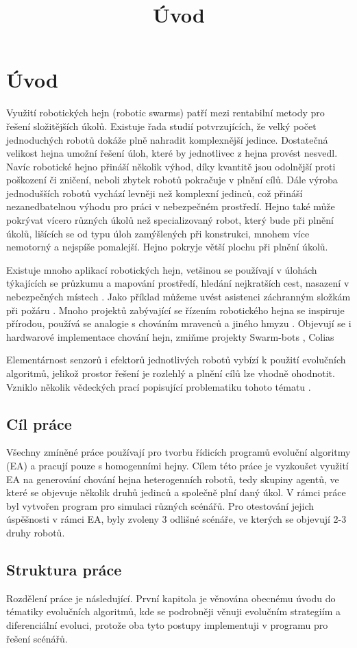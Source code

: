 \chapter*{Úvod}

\title{Úvod}
Využití robotických hejn (robotic swarms) patří mezi rentabilní metody pro řešení složitějších úkolů. Existuje řada studií potvrzujících, že velký počet jednoduchých robotů dokáže plně nahradit komplexnější jedince. Dostatečná velikost hejna umožní řešení úloh, které by jednotlivec z hejna provést nesvedl. Navíc robotické hejno přináší několik výhod, díky kvantitě jsou odolnější proti poškození či zničení, neboli zbytek robotů pokračuje v plnění cílů. Dále výroba jednodušších robotů vychází levněji než komplexní jedinců, což přináší nezanedbatelnou výhodu pro práci v nebezpečném prostředí. Hejno také může pokrývat vícero různých úkolů než specializovaný robot, který bude při plnění úkolů, lišících se od typu úloh zamýšlených při konstrukci, mnohem více nemotorný a nejspíše pomalejší. Hejno pokryje větší plochu při plnění úkolů. 
\par
Existuje mnoho aplikací robotických hejn, vetšinou se používají v úlohách týkajících se průzkumu a mapování prostředí, hledání nejkratších cest, nasazení v nebezpečných místech \citep{swarmApp}. Jako příklad můžeme uvést asistenci záchranným složkám při požáru \citep{fireRobots}. Mnoho projektů zabývající se řízením robotického hejna se inspiruje přírodou, používá se analogie s chováním mravenců a jiného hmyzu \citep{PheroRobot}. Objevují se i hardwarové implementace chování hejn, zmiňme projekty Swarm-bots \citep{swarmBots}, Colias \citep{Colias}  
\par 
Elementárnost senzorů i efektorů jednotlivých robotů vybízí k použití evolučních algoritmů, jelikož prostor řešení je rozlehlý a plnění cílů lze vhodně ohodnotit. Vzniklo několik vědeckých prací popisující problematiku tohoto tématu \citep{ENovel} \citep{geneticSwarm}.
\section*{Cíl práce}
Všechny zmíněné práce používají pro tvorbu řídicích programů evoluční algoritmy (EA) a pracují pouze s homogenními hejny. Cílem této práce je vyzkoušet využití EA na generování chování hejna heterogenních robotů, tedy skupiny agentů, ve které se objevuje několik druhů jedinců a společně plní daný úkol. V rámci práce byl vytvořen program pro simulaci různých scénářů. Pro otestování jejich úspěšnosti v rámci EA, byly zvoleny 3 odlišné scénáře, ve kterých se objevují 2-3 druhy robotů.
\section*{Struktura práce}
Rozdělení práce je následující. První kapitola je věnována obecnému úvodu do tématiky evolučních algoritmů, kde se podrobněji věnuji evolučním strategiím a diferenciální evoluci, protože oba tyto postupy implementuji v programu pro řešení scénářů. 
